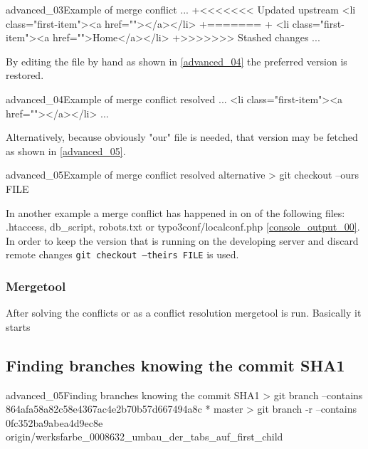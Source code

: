 \begin{codelisting}{advanced_03}{Example of merge conflict}
...
+<<<<<<< Updated upstream                                                                                                                                                                                                                    
    <li class="first-item"><a href=""></a></li>
+=======                                                                                                                                                                                                                                     
+   <li class="first-item"><a href="">Home</a></li>                                                                                                                                                              
+>>>>>>> Stashed changes
...
\end{codelisting}
By editing the file by hand as shown in \ref{advanced_04} the preferred version is restored.
\begin{codelisting}{advanced_04}{Example of merge conflict resolved}
...
    <li class="first-item"><a href=""></a></li>
...
\end{codelisting}
Alternatively, because obviously "our" file is needed, that version may be fetched as shown in \ref{advanced_05}.
\begin{codelisting}{advanced_05}{Example of merge conflict resolved alternative}
> git checkout --ours FILE
\end{codelisting}
In another example a merge conflict has happened in on of the following files: .htaccess, db\_script, robots.txt or typo3conf/localconf.php \ref{console_output_00}. In order to keep the version that is running on the developing server and discard remote changes \texttt{git checkout --theirs FILE} is used.
\subsubsection{Mergetool}
After solving the conflicts or as a conflict resolution mergetool is run. Basically it starts
\subsection{Finding branches knowing the commit SHA1}
\begin{codelisting}{advanced_05}{Finding branches knowing the commit SHA1}
> git branch --contains 864afa58a82c58e4367ac4e2b70b57d667494a8c
* master
> git branch -r --contains 0fc352ba9abea4d9ec8e
  origin/werksfarbe_0008632_umbau_der_tabs_auf_first_child
\end{codelisting}
